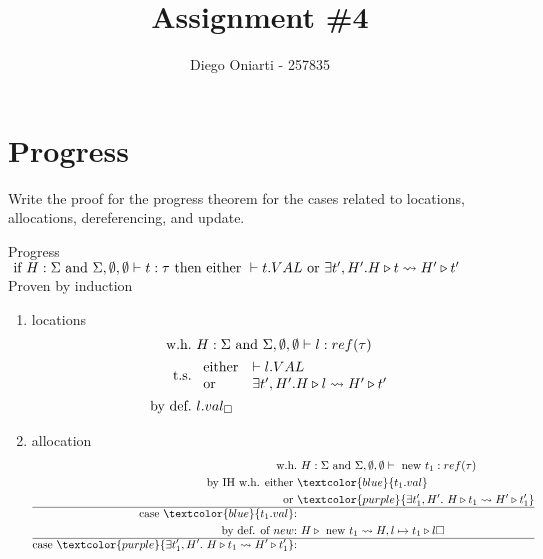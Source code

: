 \documentclass{article}
\title{Assignment \#4}
\author{Diego Oniarti - 257835}
\date{}
\begin{document}
\maketitle

\section{Progress}
Write the proof for the progress theorem for the cases related to locations, allocations, dereferencing, and update.
\begin{esempio}{Progress}
    $\text{ if } H:\Sigma\text{ and }\Sigma,\emptyset,\emptyset\vdash  t:\tau \text{ then } \text{either } \vdash t.VAL \text{ or } \exists t',H'.H\triangleright t \leadsto H'\triangleright t'$ \\
    Proven by induction
\end{esempio}
\begin{enumerate}
    \item locations
        \begin{align*}
            \text{w.h.} &\ H:\Sigma \AND \Sigma,\emptyset,\emptyset\vdash l:ref(\tau) \\
            \text{t.s.} &\ 
            \begin{array}{ll}
                \text{either}  & \vdash l.VAL \\
                \text{or}  & \exists t',H'. H\triangleright l \leadsto H'\triangleright t'
            \end{array} \\
            \text{by def.} &\ l.val_\square
        \end{align*}
    \item allocation
        \begin{align*}
            \text{w.h.} &\ H:\Sigma\AND \Sigma,\emptyset,\emptyset\vdash \NEW t_1: ref(\tau) \\
            \text{by IH w.h. either }   & \textcolor{blue}{t_1.val}\\
            \OR                         & \textcolor{purple}{\exists t_1',H'.\ H\triangleright t_1 \leadsto H'\triangleright t_1'} \\
            \hline
            \text{case $\textcolor{blue}{t_1.val}$:} &\\
            \text{by def. of $new$:} &\ H\triangleright\NEW t_1 \leadsto H,l\mapsto t_1\triangleright l \square \\
            \hline
            \text{case $\textcolor{purple}{\exists t_1',H'.\ H\triangleright t_1 \leadsto H'\triangleright t_1'}$:} &\\

\end{align*}
\end{enumerate}
\end{document}
